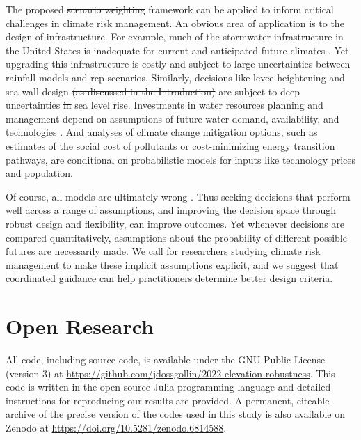 \documentclass{agujournal2019}
\providecommand{\DIFadd}[1]{{\protect\color{blue}\uwave{#1}}} %
\providecommand{\DIFdel}[1]{{\protect\color{red}\sout{#1}}}                      %
\providecommand{\DIFaddbegin}{} %
\providecommand{\DIFaddend}{} %
\providecommand{\DIFdelbegin}{} %
\providecommand{\DIFdelend}{} %
\newcommand{\DIFscaledelfig}{0.5}
\newlength{\DIFdelgraphicswidth} %
\newlength{\DIFdelgraphicsheight} %
\newcommand{\DIFaddincludegraphics}[2][]{{\color{blue}\fbox{\DIFOincludegraphics[#1]{#2}}}} %
\newcommand{\DIFdelincludegraphics}[2][]{%
\sbox{\DIFdelgraphicsbox}{\DIFOincludegraphics[#1]{#2}}%
\settoboxwidth{\DIFdelgraphicswidth}{\DIFdelgraphicsbox} %
\settoboxtotalheight{\DIFdelgraphicsheight}{\DIFdelgraphicsbox} %
\scalebox{\DIFscaledelfig}{%
\parbox[b]{\DIFdelgraphicswidth}{\usebox{\DIFdelgraphicsbox}\\[-\baselineskip] \rule{\DIFdelgraphicswidth}{0em}}\llap{\resizebox{\DIFdelgraphicswidth}{\DIFdelgraphicsheight}{%
\setlength{\unitlength}{\DIFdelgraphicswidth}%
\begin{picture}(1,1)%
\thicklines\linethickness{2pt} %
{\color[rgb]{1,0,0}\put(0,0){\framebox(1,1){}}}%
{\color[rgb]{1,0,0}\put(0,0){\line( 1,1){1}}}%
{\color[rgb]{1,0,0}\put(0,1){\line(1,-1){1}}}%
\end{picture}%
}\hspace*{3pt}}} %
} %
\DeclareRobustCommand{\DIFaddbegin}{\DIFOaddbegin \let\includegraphics\DIFaddincludegraphics} %
\DeclareRobustCommand{\DIFaddend}{\DIFOaddend \let\includegraphics\DIFOincludegraphics} %
\DeclareRobustCommand{\DIFdelbegin}{\DIFOdelbegin \let\includegraphics\DIFdelincludegraphics} %
\DeclareRobustCommand{\DIFdelend}{\DIFOaddend \let\includegraphics\DIFOincludegraphics} %
\begin{document}
The proposed \DIFdelbegin \DIFdel{scenario weighting }\DIFdelend \DIFaddbegin \DIFadd{\mbox{%
\gls{sow} }\hskip0pt%
re-weighting }\DIFaddend framework can be applied to inform critical challenges in climate risk management.
An obvious area of application is to the design of infrastructure.
For example, much of the stormwater infrastructure in the United States is inadequate for current and anticipated future climates \cite{lopez-cantu:2018}.
Yet upgrading this infrastructure is costly and subject to large uncertainties between rainfall models \cite{sharma_rcp:2021} and \gls{rcp} scenarios.
Similarly, decisions like  levee heightening \cite{garner_slrise:2018,oddo_coastal:2017,vandantzig_dike:1956} and sea wall design \DIFdelbegin \DIFdel{(as discussed in the Introduction) }\DIFdelend \DIFaddbegin \DIFadd{\mbox{%
\cite[Appendix D.,~p.~2-59]{USACE_coastal:2021} }\hskip0pt%
}\DIFaddend are subject to deep uncertainties \DIFdelbegin \DIFdel{in }\DIFdelend \DIFaddbegin \DIFadd{including }\DIFaddend sea level rise.
Investments in water resources planning and management \DIFaddbegin \DIFadd{also }\DIFaddend depend on assumptions of future water demand, availability, and technologies \cite{trindade_deeplyuncertainpathways:2019}.
And analyses of climate change mitigation options, such as estimates of the social cost of pollutants \cite{errickson_methane:2021} or cost-minimizing energy transition pathways, are conditional on probabilistic models for inputs like technology prices and population.

Of course, all models are ultimately wrong \cite{box_sciencestatistics:1976}.
Thus seeking decisions that perform well across a range of assumptions, and improving the decision space through robust design and flexibility, can improve outcomes.
Yet whenever decisions are compared quantitatively, assumptions about the probability of different possible futures are necessarily made.
We call for researchers studying climate risk management to make these implicit assumptions explicit, and we suggest that coordinated guidance can help practitioners determine better design criteria.

\section{Open Research}

All code, including source code, is available under the GNU Public License (version 3) at \url{https://github.com/jdossgollin/2022-elevation-robustness}.
This code is written in the open source Julia programming language and detailed instructions for reproducing our results are provided.
A permanent, citeable archive of the precise version of the codes used in this study is also available on Zenodo at \url{https://doi.org/10.5281/zenodo.6814588}.
\end{document}
